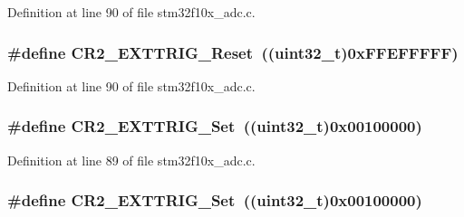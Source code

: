 Definition at line 90 of file stm32f10x\+\_\+adc.\+c.

\subsubsection[{\texorpdfstring{C\+R2\+\_\+\+E\+X\+T\+T\+R\+I\+G\+\_\+\+Reset}{CR2_EXTTRIG_Reset}}]{\setlength{\rightskip}{0pt plus 5cm}\#define C\+R2\+\_\+\+E\+X\+T\+T\+R\+I\+G\+\_\+\+Reset~(({\bf uint32\+\_\+t})0x\+F\+F\+E\+F\+F\+F\+F\+F)}\hypertarget{group___a_d_c___private___defines_ga8a96cb9aac77bab199f3dff54da230a6}{}\label{group___a_d_c___private___defines_ga8a96cb9aac77bab199f3dff54da230a6}


Definition at line 90 of file stm32f10x\+\_\+adc.\+c.

\subsubsection[{\texorpdfstring{C\+R2\+\_\+\+E\+X\+T\+T\+R\+I\+G\+\_\+\+Set}{CR2_EXTTRIG_Set}}]{\setlength{\rightskip}{0pt plus 5cm}\#define C\+R2\+\_\+\+E\+X\+T\+T\+R\+I\+G\+\_\+\+Set~(({\bf uint32\+\_\+t})0x00100000)}\hypertarget{group___a_d_c___private___defines_gaf39824995dbcbabf76697cd7116352d6}{}\label{group___a_d_c___private___defines_gaf39824995dbcbabf76697cd7116352d6}


Definition at line 89 of file stm32f10x\+\_\+adc.\+c.

\subsubsection[{\texorpdfstring{C\+R2\+\_\+\+E\+X\+T\+T\+R\+I\+G\+\_\+\+Set}{CR2_EXTTRIG_Set}}]{\setlength{\rightskip}{0pt plus 5cm}\#define C\+R2\+\_\+\+E\+X\+T\+T\+R\+I\+G\+\_\+\+Set~(({\bf uint32\+\_\+t})0x00100000)}\hypertarget{group___a_d_c___private___defines_gaf39824995dbcbabf76697cd7116352d6}{}\label{group___a_d_c___private___defines_gaf39824995dbcbabf76697cd7116352d6}


